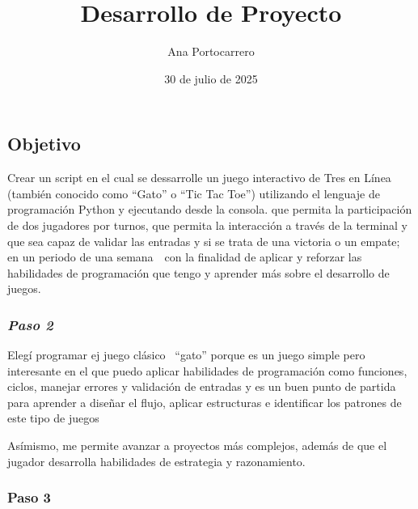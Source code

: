 \documentclass[a4paper,12pt]{article}
\title{Desarrollo de Proyecto}
\author{Ana Portocarrero}
\date{30 de julio de 2025}
\begin{document}
\maketitle

\subsection*{Objetivo}

Crear un script en el cual se dessarrolle un juego interactivo de Tres en Línea (también conocido como “Gato” o “Tic Tac Toe”) utilizando el lenguaje de programación Python y ejecutando desde la consola. que permita la participación de dos jugadores por turnos, que permita la interacción a través de la terminal y que sea capaz de validar las entradas y si se trata de una victoria o un empate; en un periodo de una semana  con la finalidad de aplicar y reforzar las habilidades de programación que tengo y aprender más sobre el desarrollo de juegos.


\subsubsection*{\textit{Paso 2}}
Elegí programar ej juego clásico  “gato” porque es un juego simple pero interesante en el que puedo aplicar habilidades de programación como funciones, ciclos, manejar errores y validación de entradas y es un buen punto de partida para aprender a diseñar el flujo, aplicar estructuras e identificar los patrones de este tipo de juegos 


Asímismo, me permite avanzar a proyectos más complejos, además de que el jugador desarrolla habilidades de estrategia y razonamiento.

 

\subsubsection*{Paso 3}
\end{document}

